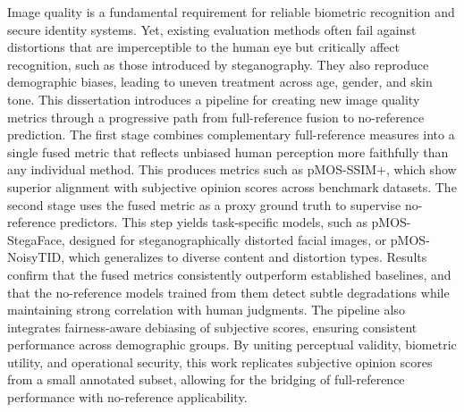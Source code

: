 Image quality is a fundamental requirement for reliable biometric recognition and secure identity systems. Yet, existing evaluation methods often fail against distortions that are imperceptible to the human eye but critically affect recognition, such as those introduced by steganography.
They also reproduce demographic biases, leading to uneven treatment across age, gender, and skin tone. This dissertation introduces a pipeline for creating new image quality metrics through a progressive path from full-reference fusion to no-reference prediction.
The first stage combines complementary full-reference measures into a single fused metric that reflects unbiased human perception more faithfully than any individual method. This produces metrics such as pMOS-SSIM+, which show superior alignment with subjective opinion scores across benchmark datasets. The second stage uses the fused metric as a proxy ground truth to supervise no-reference predictors. This step yields task-specific models, such as pMOS-StegaFace, designed for steganographically distorted facial images, or pMOS-NoisyTID, which generalizes to diverse content and distortion types. Results confirm that the fused metrics consistently outperform established baselines, and that the no-reference models trained from them detect subtle degradations while maintaining strong correlation with human judgments. The pipeline also integrates fairness-aware debiasing of subjective scores, ensuring consistent performance across demographic groups. By uniting perceptual validity, biometric utility, and operational security, this work replicates subjective opinion scores from a small annotated subset, allowing for the bridging of full-reference performance with no-reference applicability.
